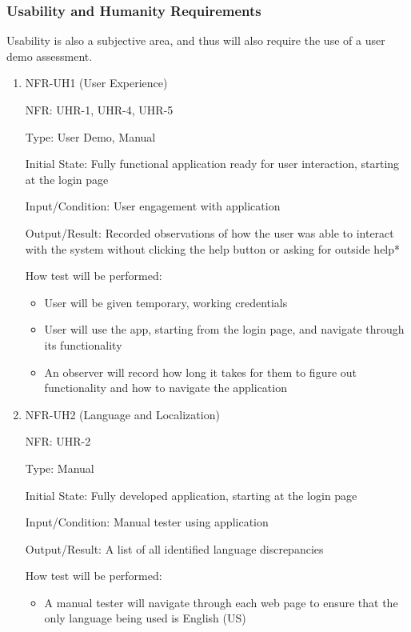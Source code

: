 \documentclass[12pt, titlepage]{article}
\begin{document}
\subsubsection{Usability and Humanity Requirements}
Usability is also a subjective area, and thus will also require the use of a
user demo assessment.
\begin{enumerate}

  \item{NFR-UH1 (User Experience)\\}
  
  NFR: UHR-1, UHR-4, UHR-5

  Type: User Demo, Manual

  Initial State: Fully functional application ready for user interaction,
  starting at the login page
  
  Input/Condition: User engagement with application
  
  Output/Result: Recorded observations of how the user was able to interact with
  the system without clicking the help button or asking for outside help*
  
  How test will be performed:
  \begin{itemize}
    \item User will be given temporary, working credentials 
    \item User will use the app, starting from the login page, and navigate
    through its functionality
    \item An observer will record how long it takes for them to figure out
    functionality and how to navigate the application
  \end{itemize}
            
  \item{NFR-UH2 (Language and Localization)\\}
  
  NFR: UHR-2
  
  Type: Manual
  
  Initial State: Fully developed application, starting at the login page
  
  Input/Condition: Manual tester using application
  
  Output/Result: A list of all identified language discrepancies
  
  How test will be performed:
  \begin{itemize}
    \item A manual tester will navigate through each web page to ensure that the
    only language being used is English (US)  
  \end{itemize}


\end{enumerate}
\end{document}
